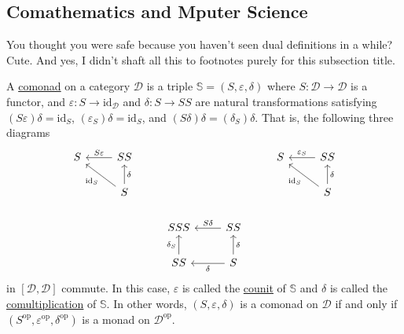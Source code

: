 \documentclass[a4paper,11pt]{article}
\theoremstyle{break_italics}
\theoremstyle{break_upright}
\theoremstyle{remark}
\newcommand{\id}{\mathrm{id}}
\newcommand{\D}{\mathcal{D}}
\newcommand{\op}{\mathrm{op}}
\begin{document}
\subsection{Comathematics and Mputer Science}

You thought you were safe because you haven't seen dual definitions in a while? Cute. And yes, I didn't shaft all this to footnotes purely for this subsection title.

A \uline{comonad} on a category $\D$ is a triple $\mathbb S = (S, \varepsilon, \delta)$ where $S \colon \D \to \D$ is a functor, and $\varepsilon \colon S \to \id_\D$ and $\delta \colon S \to SS$ are natural transformations satisfying $(S\varepsilon)\delta = \id_S$, $(\varepsilon_{S})\delta = \id_S$, and $(S\delta)\delta = (\delta_S)\delta$. That is, the following three diagrams
\[
\begin{tikzcd}
S & SS \arrow[l, "S\varepsilon"']              &                          &                                            & S & SS \arrow[l, "\varepsilon_S"']             \\
  & S \arrow[lu, "\id_S"] \arrow[u, "\delta"'] &                          &                                            &   & S \arrow[lu, "\id_S"] \arrow[u, "\delta"'] \\
  &                                            & SSS                      & SS \arrow[l, "S\delta"']                   &   &                                            \\
  &                                            & SS \arrow[u, "\delta_S"] & S \arrow[u, "\delta"'] \arrow[l, "\delta"] &   &                                           
\end{tikzcd}
\]
in $[\D,\D]$ commute. In this case, $\varepsilon$ is called the \uline{counit} of $\mathbb S$ and $\delta$ is called the \uline{comultiplication} of $\mathbb S$. In other words, $(S, \varepsilon, \delta)$ is a comonad on $\D$ if and only if $(S^\op, \varepsilon^\op, \delta^\op)$ is a monad on $\D^\op$.
\end{document}
